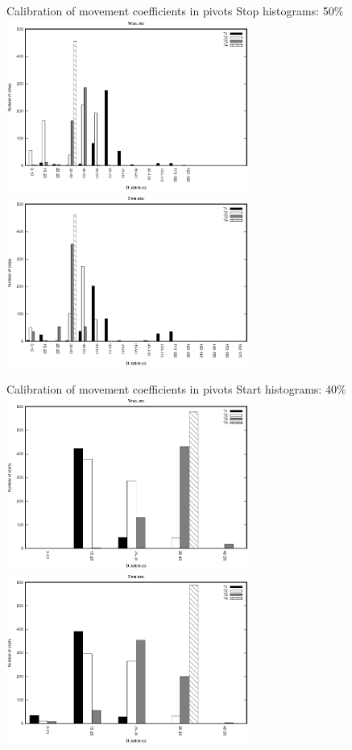 \documentclass[10pt]{beamer}
\begin{document}
\begin{frame}{Calibration of movement coefficients in pivots}
{Stop histograms: 50\%}
	\includegraphics[width=0.60\textwidth]{pivot-measured-stops-50.eps}\\
	\includegraphics[width=0.60\textwidth]{pivot-simulated-stops-50.eps}
\end{frame}

\begin{frame}{Calibration of movement coefficients in pivots}
{Start histograms: 40\%}
	\includegraphics[width=0.60\textwidth]{pivot-measured-starts-40.eps}\\
	\includegraphics[width=0.60\textwidth]{pivot-simulated-starts-40.eps}
\end{frame}
\end{document}
